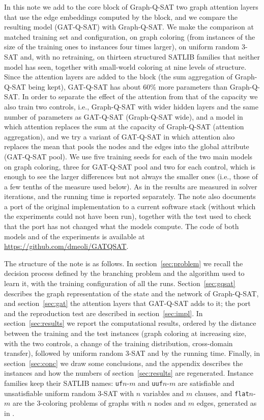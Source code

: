 \documentclass[11pt,a4paper]{article}
\newcommand{\code}[1]{\texttt{\def\_{\textunderscore\allowbreak}#1}}
\begin{document}
\smallskip
\noindent
In this note we add to the core block of Graph-Q-SAT two graph attention layers
that use the edge embeddings computed by the block, and we compare the
resulting model (GAT-Q-SAT) with Graph-Q-SAT. We make the comparison at
matched training set and configuration, on graph coloring (from instances of
the size of the training ones to instances four times larger), on uniform
random 3-SAT and, with no retraining, on thirteen structured SATLIB families
that neither model has seen, together with small-world coloring at nine levels
of structure. Since the attention layers are added to the block (the sum
aggregation of Graph-Q-SAT being kept), GAT-Q-SAT has about 60\% more
parameters than Graph-Q-SAT. In order to separate the effect of the
attention from that of the capacity we also train two controls, i.e.,
Graph-Q-SAT with wider hidden layers and the same number of parameters as
GAT-Q-SAT (Graph-Q-SAT wide), and a model in which attention replaces the sum
at the capacity of Graph-Q-SAT (attention aggregation), and we try a variant
of GAT-Q-SAT in which attention also replaces the mean that pools the nodes and
the edges into the global attribute (GAT-Q-SAT pool). We use five training
seeds for each of the two main models on graph coloring, three for GAT-Q-SAT
pool and two for each control, which is enough to see the larger
differences but not always the smaller ones (i.e., those of a few tenths of the
measure used below). As in \cite{Kurin2020} the results are measured
in solver iterations, and the running time is reported separately. The note
also documents a port of the original implementation to a current software
stack (without which the experiments could not have been run), together with
the test used to check that the port has not changed what the models compute.
The code of both models and of the experiments is available at
\url{https://github.com/dmeoli/GATQSAT}.

\smallskip
\noindent
The structure of the note is as follows. In section~\ref{sec:problem} we recall
the decision process defined by the branching problem and the algorithm used to
learn it, with the training configuration of all the runs. Section~\ref{sec:gqsat}
describes the graph representation of the state and the network of Graph-Q-SAT,
and section~\ref{sec:gat} the attention layers that GAT-Q-SAT adds to it; the
port and the reproduction test are described in section~\ref{sec:impl}. In
section~\ref{sec:results} we report the computational results, ordered by the
distance between the training and the test instances (graph coloring at
increasing size, with the two controls, a change of the training distribution,
cross-domain transfer), followed by uniform random 3-SAT and by the running time. Finally, in
section~\ref{sec:conc} we draw some conclusions, and the appendix describes the
instances and how the numbers of section~\ref{sec:results} are regenerated.
Instance families keep their SATLIB \cite{HoosStutzle2000} names:
\code{uf}$n$-$m$ and \code{uuf}$n$-$m$ are satisfiable and unsatisfiable
uniform random 3-SAT with $n$ variables and $m$ clauses, and \code{flat}$n$-$m$
are the 3-coloring problems of graphs with $n$ nodes and $m$ edges, generated
as in \cite{CulbersonLuo1996}.
\end{document}
